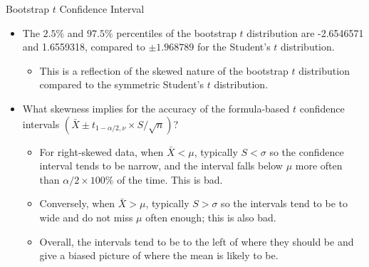 \documentclass[
  ignorenonframetext,
]{beamer}
\providecommand{\tightlist}{%
  \setlength{\itemsep}{0pt}\setlength{\parskip}{0pt}}
\begin{document}
\begin{frame}{Bootstrap \(t\) Confidence Interval}
\label{bootstrap-t-confidence-interval-8}
\begin{itemize}
\item
  The \(2.5\%\) and \(97.5\%\) percentiles of the bootstrap \(t\)
  distribution are -2.6546571 and 1.6559318, compared to \(\pm1.968789\)
  for the Student's \(t\) distribution.

  \begin{itemize}
  \tightlist
  \item
    This is a reflection of the skewed nature of the bootstrap \(t\)
    distribution compared to the symmetric Student's \(t\) distribution.
  \end{itemize}
\item
  What skewness implies for the accuracy of the formula-based \(t\)
  confidence intervals
  \((\bar{X}\pm t_{1-\alpha/2, \nu}\times S/\sqrt{n})\)?

  \begin{itemize}
  \tightlist
  \item
    For right-skewed data, when \(\bar{X}<\mu\), typically \(S< \sigma\)
    so the confidence interval tends to be narrow, and the interval
    falls below \(\mu\) more often than \(\alpha/2\times 100\%\) of the
    time. This is bad.
  \item
    Conversely, when \(\bar{X}>\mu\), typically \(S>\sigma\) so the
    intervals tend to be to wide and do not miss \(\mu\) often enough;
    this is also bad.
  \item
    Overall, the intervals tend to be to the left of where they should
    be and give a biased picture of where the mean is likely to be.
  \end{itemize}
\end{itemize}
\end{frame}
\end{document}
